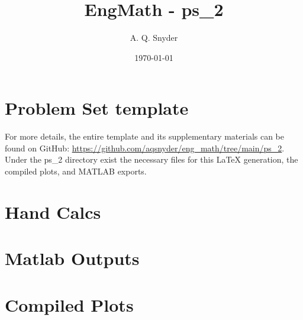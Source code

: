 \documentclass{article}
\begin{document}
\title{EngMath - ps\_2}
\author{A. Q. Snyder}
\date{\today}

\maketitle

\section{Problem Set template}

For more details, the entire template and its supplementary materials can be found on GitHub: \href{https://github.com/aqsnyder/eng_math/tree/main/ps_2}{https://github.com/aqsnyder/eng_math/tree/main/ps_2}.
Under the ps\_2 directory exist the necessary files for this LaTeX generation, the compiled plots, and MATLAB exports.


\section{Hand Calcs}
\vspace{2cm}  %

 
 
 
 

\section{Matlab Outputs}
\vspace{2cm}  %







\section{Compiled Plots}

\end{document}
